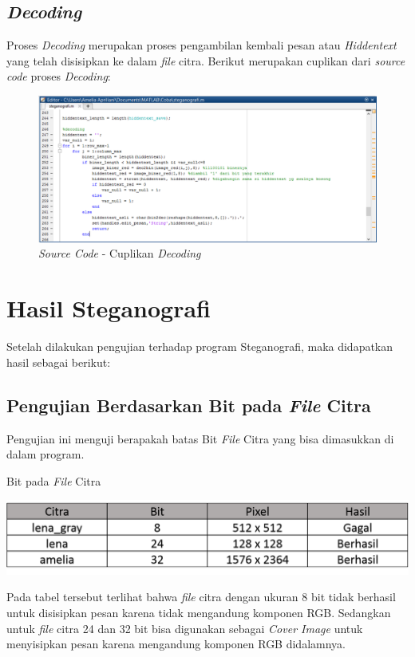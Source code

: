 \subsection{\emph{Decoding}}
Proses \emph{Decoding} merupakan proses pengambilan kembali pesan atau \emph{Hiddentext} yang telah disisipkan ke dalam \emph{file} citra. Berikut merupakan cuplikan dari \emph{source code} proses \emph{Decoding}:
	\begin{figure}[H]
		\centering
		\includegraphics[width=1\textwidth]{gambar/source_code/cuplikan_decoding}
		\caption{\emph{Source Code} - Cuplikan \emph{Decoding}}
		\label{cuplikan_decoding}
	\end{figure}
	
\section{Hasil Steganografi}
Setelah dilakukan pengujian terhadap program Steganografi, maka didapatkan hasil sebagai berikut:
	\subsection{Pengujian Berdasarkan Bit pada \emph{File} Citra}
	Pengujian ini menguji berapakah batas Bit \emph{File} Citra yang bisa dimasukkan di dalam program.
	
	\begin{table}[H]
		\centering
		\caption{Bit pada \emph{File} Citra}
		\includegraphics[width=1.0\textwidth]{gambar/table_bitcitra}
		\label{tabel_bitcitra}
	\end{table}
	
	Pada tabel tersebut terlihat bahwa \emph{file} citra dengan ukuran 8 bit tidak berhasil untuk disisipkan pesan karena tidak mengandung komponen RGB. Sedangkan untuk \emph{file} citra 24 dan 32 bit bisa digunakan sebagai \emph{Cover Image} untuk menyisipkan pesan karena mengandung komponen RGB didalamnya.
	
